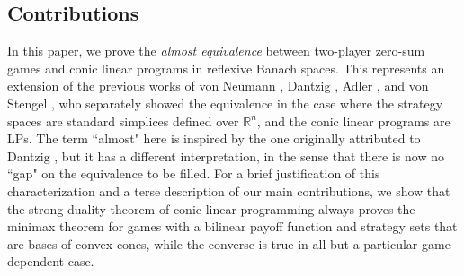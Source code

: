 \documentclass[11pt, twoside]{article}
\numberwithin{equation}{section}
\theoremstyle{definition}
\begin{document}
\vspace{-0.1cm}\subsection{Contributions}\vspace{-0.2cm}

In this paper, we prove the \textit{almost equivalence} between two-player zero-sum games and conic linear programs in reflexive Banach spaces. This represents an extension of the previous works of von Neumann \cite{VonNeumann1944-VONTOG-4}, Dantzig \cite{dantzig1951proof, dantzig2016linear}, Adler \cite{adler2013equivalence}, and von Stengel \cite{von2024zero}, who separately showed the equivalence in the case where the strategy spaces are standard simplices defined over $\mathbb{R}^n$, and the conic linear programs are LPs. The term ``almost" here is inspired by the one originally attributed to Dantzig \cite{dantzig1951proof}, but it has a different interpretation, in the sense that there is now no ``gap" on the equivalence to be filled. For a brief justification of this characterization and a terse description of our main contributions, we show that the strong duality theorem of conic linear programming always proves the minimax theorem for games with a bilinear payoff function and strategy sets that are bases of convex cones, while the converse is true in all but a particular game-dependent case.\par
\end{document}
